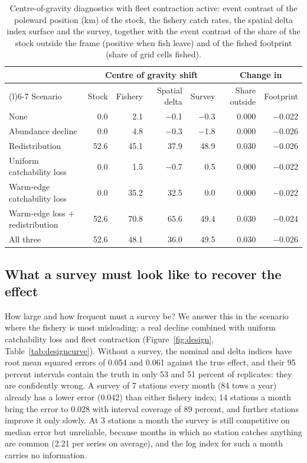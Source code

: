 \documentclass[11pt,a4paper]{article}
\begin{document}
\begin{table}[tbp]
\centering\footnotesize
\caption{Centre-of-gravity diagnostics with fleet contraction active: event contrast of the poleward position (km) of the stock, the fishery catch rates, the spatial delta index surface and the survey, together with the event contrast of the share of the stock outside the frame (positive when fish leave) and of the fished footprint (share of grid cells fished).}
\label{tab:cog}
\begin{tabular}{@{}>{\raggedright\arraybackslash}p{3.6cm}rrrrrr@{}}
\toprule
 & \multicolumn{4}{c}{Centre of gravity shift} & \multicolumn{2}{c}{Change in} \\
\cmidrule(lr){2-5}\cmidrule(l){6-7}
Scenario & Stock & Fishery & Spatial delta & Survey & Share outside & Footprint \\
\midrule
None & 0.0 & 2.1 & $-$0.1 & $-$0.3 & 0.000 & $-$0.022 \\
Abundance decline & 0.0 & 4.8 & $-$0.3 & $-$1.8 & 0.000 & $-$0.026 \\
Redistribution & 52.6 & 45.1 & 37.9 & 48.9 & 0.030 & $-$0.026 \\
Uniform catchability loss & 0.0 & 1.5 & $-$0.7 & 0.5 & 0.000 & $-$0.022 \\
Warm-edge catchability loss & 0.0 & 35.2 & 32.5 & 0.0 & 0.000 & $-$0.022 \\
Warm-edge loss + redistribution & 52.6 & 70.8 & 65.6 & 49.4 & 0.030 & $-$0.024 \\
All three & 52.6 & 48.1 & 36.0 & 49.5 & 0.030 & $-$0.026 \\
\bottomrule
\end{tabular}
\end{table}

\subsection{What a survey must look like to recover the effect}
\label{sec:res-survey}

How large and how frequent must a survey be? We answer this in the scenario where the fishery is most misleading: a real decline combined with uniform catchability loss and fleet contraction (Figure~\ref{fig:design}, Table~\ref{tab:designcurve}). Without a survey, the nominal and delta indices have root mean squared errors of 0.054 and 0.061 against the true effect, and their 95 percent intervals contain the truth in only 53 and 51 percent of replicates: they are confidently wrong. A survey of 7 stations every month (84 tows a year) already has a lower error (0.042) than either fishery index; 14 stations a month bring the error to 0.028 with interval coverage of 89 percent, and further stations improve it only slowly. At 3 stations a month the survey is still competitive on median error but unreliable, because months in which no station catches anything are common (2.21 per series on average), and the log index for such a month carries no information.
\end{document}
